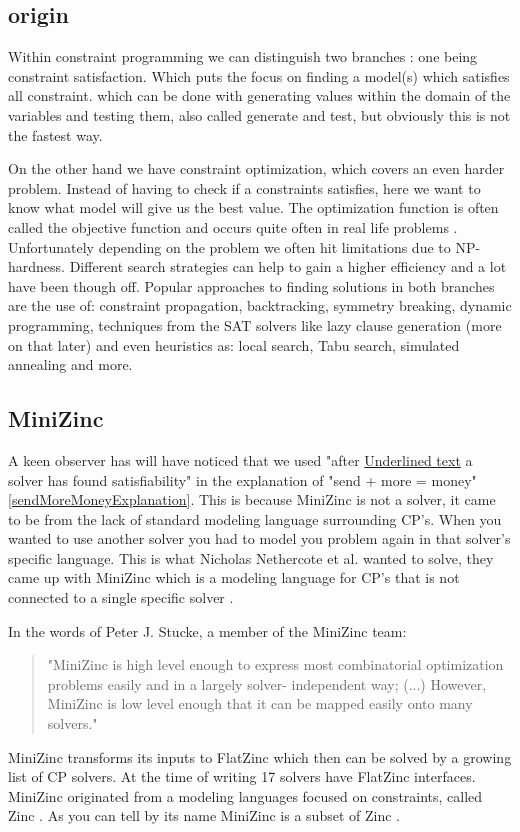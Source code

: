 \subsection{origin}
Within constraint programming we can distinguish two branches \cite{52bartak1999constraint}: one being constraint satisfaction. Which puts the focus on finding a model(s) which satisfies all constraint. which can be done with generating values within the domain of the variables and testing them, also called generate and test, but obviously this is not the fastest way. 

On the other hand we have constraint optimization, which covers an even harder problem. Instead of having to check if a constraints satisfies, here we want to know what model will give us the best value. The optimization function is often called the objective function and occurs quite often in real life problems \cite{52bartak1999constraint}. Unfortunately depending on the problem we often hit limitations due to NP-hardness. Different search strategies can help to gain a higher efficiency and a lot have been though off. Popular approaches to finding solutions in both branches are the use of: constraint propagation, backtracking, symmetry breaking, dynamic programming, techniques from the SAT solvers like lazy clause generation (more on that later) and even heuristics as: local search, Tabu search, simulated annealing and more. 

\subsection{MiniZinc}
A keen observer has will have noticed that we used "after \underline{Underlined text} a solver has found satisfiability" in the explanation of "send + more = money" \ref{sendMoreMoneyExplanation}. This is because MiniZinc is not a solver, it came to be from the lack of standard modeling language surrounding CP's. When you wanted to use another solver you had to model you problem again in that solver's specific language. This is what Nicholas Nethercote et al. wanted to solve, they came up with MiniZinc which is a modeling language for CP's that is not connected to a single specific solver \cite{57nethercote2007minizinc}. 

In the words of Peter J. Stucke, a member of the MiniZinc team: 
\begin{quote}
	"MiniZinc is high level enough to express most combinatorial optimization problems easily and in a largely solver-
	independent way; (...) However, MiniZinc is low level enough that it can be mapped easily onto many solvers." \cite{58stuckey2014minizinc}
\end{quote}
MiniZinc transforms its inputs to FlatZinc which then can be solved by a growing list of CP solvers. At the time of writing 17 solvers have FlatZinc interfaces. MiniZinc originated from a modeling languages focused on constraints, called Zinc \cite{68incbanda2006modelling}. As you can tell by its name MiniZinc is a subset of Zinc \cite{57nethercote2007minizinc}.

